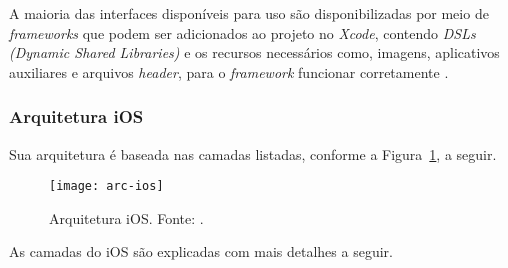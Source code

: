 A maioria das interfaces disponíveis para uso são disponibilizadas por meio de \textit{frameworks} que podem ser adicionados ao projeto no \textit{Xcode}, contendo \textit{DSLs (Dynamic Shared Libraries)} e os recursos necessários como, 
imagens, aplicativos auxiliares e arquivos \textit{header}, para o \textit{framework} funcionar corretamente \cite{apple_inc_tech_2014}.

\subsubsection{Arquitetura iOS} \label{subsubsection:arc-ios}
Sua arquitetura é baseada nas camadas listadas, conforme a Figura~\ref{fig:arc-ios}, a seguir.
 
\begin{figure}[H]
  \centering
    \texttt{[image: arc-ios]}
    \caption[Arquitetura iOS]{ Arquitetura iOS. Fonte: \cite{apple_inc_tech_2014}.}
	\label{fig:arc-ios}
\end{figure}

As camadas do iOS são explicadas com mais detalhes a seguir.
 
